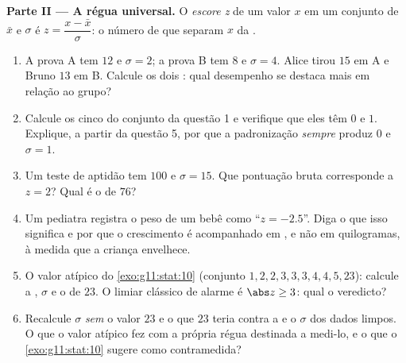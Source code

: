 \begin{problem}
\medskip
\noindent\textbf{Parte II --- A régua universal.}
O \emph{escore z} de um valor $x$ em
um conjunto de  $\bar x$ e  $\sigma$ é
$z = \dfrac{x - \bar x}{\sigma}$: o número de  que
separam $x$ da .
\begin{enumerate}[resume]
  \item A prova A tem  $12$ e $\sigma = 2$; a prova B tem
         $8$ e $\sigma = 4$. Alice tirou $15$ em A e Bruno
        $13$ em B. Calcule os dois : qual desempenho
        se destaca mais em relação ao grupo?
  \item Calcule os cinco  do conjunto da questão 1 e
        verifique que eles têm  $0$ e  $1$.
        Explique, a partir da questão 5, por que a padronização
        \emph{sempre} produz  $0$ e $\sigma = 1$.
  \item Um teste de aptidão tem  $100$ e $\sigma = 15$. Que
        pontuação bruta corresponde a $z = 2$? Qual é o  de $76$?
  \item Um pediatra registra o peso de um bebê como
        ``$z = -2.5$''. Diga o que isso significa e por que o
        crescimento é acompanhado em , e não em
        quilogramas, à medida que a criança envelhece.
  \item O valor atípico do \cref{exo:g11:stat:10} (conjunto
        $1, 2, 2, 3, 3, 3, 4, 4, 5, 23$): calcule a ,
        $\sigma$ e o  de $23$. O limiar clássico de
        alarme é $\abs z \geq 3$: qual o veredicto?
  \item Recalcule $\sigma$ \emph{sem} o valor $23$ e o 
        que $23$ teria contra a  e o $\sigma$ dos dados
        limpos. O que o valor atípico fez com a própria régua
        destinada a medi-lo, e o que o \cref{exo:g11:stat:10}
        sugere como contramedida?
\end{enumerate}


\end{problem}

